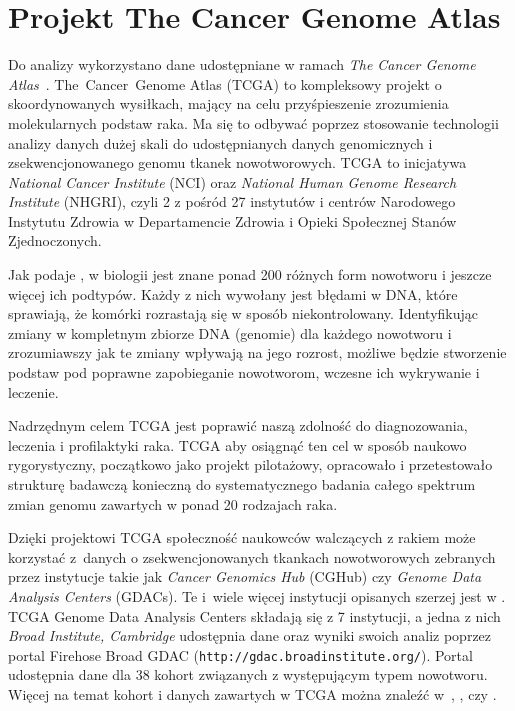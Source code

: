 \section{Projekt The Cancer Genome Atlas}\label{chan:TCGA}

Do analizy wykorzystano dane udostępniane w ramach \textit{The Cancer Genome Atlas}~\cite{broad}. The~Cancer~Genome Atlas (TCGA) to kompleksowy projekt o skoordynowanych wysiłkach, mający na celu przyśpieszenie zrozumienia molekularnych podstaw raka. Ma się to odbywać poprzez stosowanie technologii analizy danych dużej skali do udostępnianych danych genomicznych i zsekwencjonowanego genomu tkanek nowotworowych. TCGA to inicjatywa \textit{National Cancer Institute} (NCI) oraz \textit{National Human Genome Research Institute} (NHGRI), czyli 2 z pośród 27 instytutów i centrów Narodowego Instytutu Zdrowia w Departamencie Zdrowia i Opieki Społecznej Stanów Zjednoczonych.

Jak podaje \cite{patrycja}, w biologii jest znane ponad 200 różnych form nowotworu i jeszcze więcej ich podtypów. Każdy z nich wywołany jest błędami w DNA, które sprawiają, że komórki rozrastają się w sposób niekontrolowany. Identyfikując zmiany w kompletnym zbiorze DNA (genomie) dla każdego nowotworu i zrozumiawszy jak te zmiany wpływają na jego rozrost, możliwe będzie stworzenie podstaw pod poprawne zapobieganie nowotworom, wczesne ich wykrywanie i leczenie. 

Nadrzędnym celem TCGA jest poprawić naszą zdolność do diagnozowania, leczenia i profilaktyki raka. TCGA aby osiągnąć ten cel w sposób naukowo rygorystyczny, początkowo jako projekt pilotażowy, opracowało i przetestowało strukturę badawczą konieczną do systematycznego badania całego spektrum zmian genomu zawartych w ponad 20 rodzajach raka.

Dzięki projektowi TCGA społeczność naukowców walczących z rakiem może korzystać z~danych o zsekwencjonowanych tkankach nowotworowych zebranych przez instytucje takie jak \textit{Cancer Genomics Hub} (CGHub) czy \textit{Genome Data Analysis Centers} (GDACs). Te i~wiele więcej instytucji opisanych szerzej jest w \cite{patrycja}. TCGA Genome Data Analysis Centers składają się z 7 instytucji, a jedna z nich \textit{Broad Institute, Cambridge} udostępnia dane oraz wyniki swoich analiz poprzez portal Firehose Broad GDAC (\texttt{http://gdac.broadinstitute.org/}). Portal udostępnia dane dla 38 kohort związanych z występującym typem nowotworu. Więcej na temat kohort i danych zawartych w TCGA można znaleźć w~\cite{chin1}, \cite{chin2}, \cite{future} czy \cite{patrycja}. 

